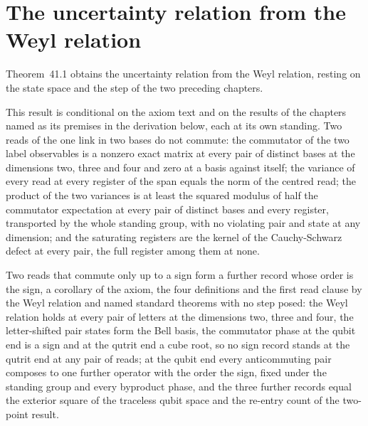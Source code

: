 \section{The uncertainty relation from the Weyl relation}\label{mod:II-3-uncertainty-relation-from-the-weyl-relation}
\label{narr:open:2-3}Theorem~41.1 obtains the uncertainty relation from the Weyl relation, resting on the state space and the step of the two preceding chapters.
\begin{chconditional}\label{box:II-3-uncertainty-relation-from-the-weyl-relation:1}
This result is conditional on the axiom text and on the results of the chapters named as its premises in the derivation below, each at its own standing.
Two reads of the one link in two bases do not commute: the commutator of the two label observables is a nonzero exact matrix at every pair of distinct bases at the dimensions two, three and four and zero at a basis against itself; the variance of every read at every register of the span equals the norm of the centred read; the product of the two variances is at least the squared modulus of half the commutator expectation at every pair of distinct bases and every register, transported by the whole standing group, with no violating pair and state at any dimension; and the saturating registers are the kernel of the Cauchy-Schwarz defect at every pair, the full register among them at none.
\end{chconditional}
Two reads that commute only up to a sign form a further record whose order is the sign, a corollary of the axiom, the four definitions and the first read clause by the Weyl relation and named standard theorems with no step posed: the Weyl relation holds at every pair of letters at the dimensions two, three and four, the letter-shifted pair states form the Bell basis, the commutator phase at the qubit end is a sign and at the qutrit end a cube root, so no sign record stands at the qutrit end at any pair of reads; at the qubit end every anticommuting pair composes to one further operator with the order the sign, fixed under the standing group and every byproduct phase, and the three further records equal the exterior square of the traceless qubit space and the re-entry count of the two-point result.
